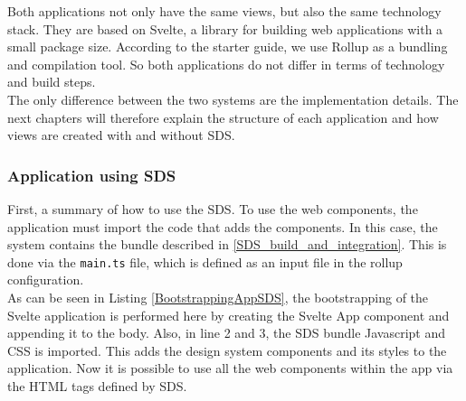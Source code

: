 Both applications not only have the same views, but also the same technology stack. They are based on Svelte, a library for building web applications with a small package size. According to the starter guide, we use Rollup as a bundling and compilation tool. So both applications do not differ in terms of technology and build steps. \cite{svelte_svelte_nodate} \\
The only difference between the two systems are the implementation details. The next chapters will therefore explain the structure of each application and how views are created with and without SDS.
\subsubsection{Application using \ac{SDS}}
First, a summary of how to use the \acl{SDS}. To use the web components, the application must import the code that adds the components. In this case, the system contains the bundle described in \ref{SDS_build_and_integration}. This is done via the \texttt{main.ts} file, which is defined as an input file in the rollup configuration. \\

As can be seen in Listing \ref{BootstrappingAppSDS}, the bootstrapping of the Svelte application is performed here by creating the Svelte App component and appending it to the body. Also, in line 2 and 3, the SDS bundle Javascript and \ac{CSS} is imported. This adds the design system components and its styles to the application. Now it is possible to use all the web components within the app via the \ac{HTML} tags defined by \ac{SDS}. \\

